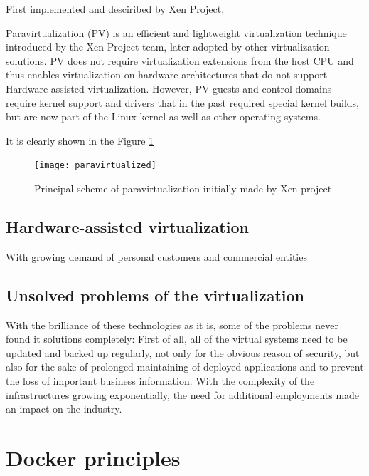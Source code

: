 First implemented and desciribed by Xen Project,

\begin{definition}
Paravirtualization (PV) is an efficient and lightweight virtualization technique
introduced by the Xen Project team, later adopted by other
virtualization solutions. PV does not require virtualization extensions from
the host CPU and thus enables virtualization on hardware architectures that do
not support Hardware-assisted virtualization.
However, PV guests and control domains require kernel
support and drivers that in the past required special kernel builds,
but are now part of the Linux kernel as well as other
operating systems\cite{ParavirtualizationDefinition}.
\end{definition}

It is clearly shown in the Figure \ref{fig:ParavirtualizationPic}
\begin{figure}
\texttt{[image: paravirtualized]}
\caption{Principal scheme of paravirtualization initially made by Xen project}
\cite{ParavirtualizationPic}
\label{fig:ParavirtualizationPic}
\end{figure}

\subsection{Hardware-assisted virtualization}

With growing demand of personal customers and commercial entities

\subsection{Unsolved problems of the virtualization}

With the brilliance of these technologies as it is,
some of the problems never found it solutions completely:
First of all, all of the virtual systems
need to be updated and backed up regularly,
not only for the obvious reason of security,
but also for the sake of prolonged maintaining of deployed applications and to
prevent the loss of important business information.
With the complexity of the infrastructures
growing exponentially, the need for additional
employments made an impact on the industry\cite{VirtualizationProblems}.

\section{Docker principles}


